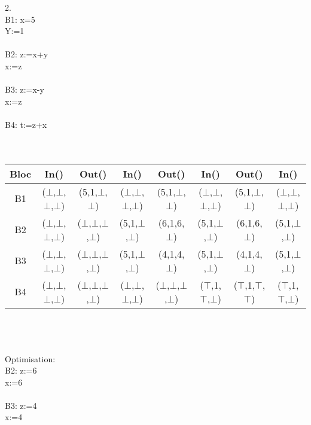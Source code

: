 \documentclass[10pt,a4paper]{article}
\begin{document}
{\large 2.}\\
B1: x=5\\Y:=1\\
\\
B2: z:=x+y\\
x:=z\\
\\
B3: z:=x-y\\
x:=z\\
\\
B4: t:=z+x\\
\\
\\
\begin{tabular}{|c|c|c|c|c|c|c|c|}
\hline 
Bloc & In() & Out() & In() & Out() & In() & Out() & In() \\ 
\hline 
B1 & ($\bot$,$\bot$,$\bot$,$\bot$) & (5,1,$\bot$,$\bot$) & ($\bot$,$\bot$,$\bot$,$\bot$) & (5,1,$\bot$,$\bot$) & ($\bot$,$\bot$,$\bot$,$\bot$) & (5,1,$\bot$,$\bot$) & ($\bot$,$\bot$,$\bot$,$\bot$) \\ 
\hline 
B2 & ($\bot$,$\bot$,$\bot$,$\bot$) & ($\bot$,$\bot$,$\bot$,$\bot$) & (5,1,$\bot$,$\bot$) & (6,1,6,$\bot$) & (5,1,$\bot$,$\bot$) & (6,1,6,$\bot$) & (5,1,$\bot$,$\bot$) \\ 
\hline 
B3 & ($\bot$,$\bot$,$\bot$,$\bot$) & ($\bot$,$\bot$,$\bot$,$\bot$) & (5,1,$\bot$,$\bot$) & (4,1,4,$\bot$) & (5,1,$\bot$,$\bot$) & (4,1,4,$\bot$) & (5,1,$\bot$,$\bot$) \\ 
\hline 
B4 & ($\bot$,$\bot$,$\bot$,$\bot$) & ($\bot$,$\bot$,$\bot$,$\bot$) & ($\bot$,$\bot$,$\bot$,$\bot$) & ($\bot$,$\bot$,$\bot$,$\bot$) & ($\top$,1,$\top$,$\bot$) & ($\top$,1,$\top$,$\top$) & ($\top$,1,$\top$,$\bot$) \\ 
\hline 
\end{tabular} \\\\
\\
Optimisation:\\
B2: z:=6\\
x:=6\\
\\
B3: z:=4\\
x:=4\\
\\
\end{document}
